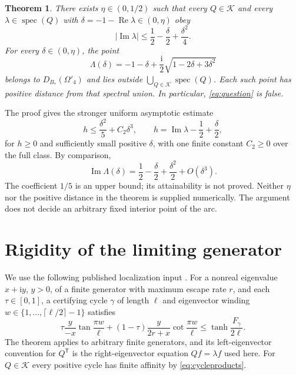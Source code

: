 \documentclass[11pt,a4paper]{article}
\newtheorem{theorem}{Theorem}
\newcommand{\K}{\mathcal K}
\newcommand{\spec}{\operatorname{spec}}
\newcommand{\Rea}{\operatorname{Re}}
\newcommand{\Ima}{\operatorname{Im}}
\newcommand{\ii}{\mathrm i}
\newcommand{\Bstar}{B_*}
\newcommand{\trans}{^{\mathsf T}}
\begin{document}
\begin{theorem}\label{thm:missing}
There exists $\eta\in(0,1/2)$ such that every $Q\in\K$ and every
$\lambda\in\spec(Q)$ with $\delta=-1-\Rea\lambda\in(0,\eta)$ obey
\begin{equation}\label{eq:mainbound}
 |\Ima\lambda|\leq\frac12-\frac\delta2+\frac{\delta^2}{4}.
\end{equation}
For every $\delta\in(0,\eta)$, the point
\begin{equation}\label{eq:compressed}
 \Lambda(\delta)=-1-\delta+
       \frac{\ii}{2}\sqrt{1-2\delta+3\delta^2}
\end{equation}
belongs to $D_{\Bstar}(\Omega'_4)$ and lies outside
$\bigcup_{Q\in\K}\spec(Q)$. Each such point has positive distance
from that spectral union. In particular, \eqref{eq:question} is false.
\end{theorem}

The proof gives the stronger uniform asymptotic estimate
\begin{equation}\label{eq:strongbound}
 h\leq\frac{\delta^2}{5}+C_2\delta^3,
 \qquad h=\Ima\lambda-\frac12+\frac\delta2,
\end{equation}
for $h\geq0$ and sufficiently small positive $\delta$, with one finite
constant $C_2\geq0$ over the full class. By comparison,
\begin{equation}\label{eq:arcexpansion}
 \Ima\Lambda(\delta)=\frac12-\frac\delta2+
                  \frac{\delta^2}{2}+O(\delta^3).
\end{equation}
The coefficient $1/5$ is an upper bound; its attainability is not proved.
Neither $\eta$ nor the positive distance in the theorem is supplied
numerically. The argument does not decide an arbitrary fixed interior
point of the arc.

\section{Rigidity of the limiting generator}\label{sec:rigidity}

We use the following published localization input
\cite[Theorem~3]{Kolchinsky2026}. For a nonreal eigenvalue $x+\ii y$,
$y>0$, of a finite generator with maximum escape rate $r$, and each
$\tau\in[0,1]$, a certifying cycle $\gamma$ of length $\ell$ and
eigenvector winding $w\in\{1,\ldots,\lceil\ell/2\rceil-1\}$ satisfies
\begin{equation}\label{eq:sourcebound}
 \tau\frac{y}{-x}\tan\frac{\pi w}{\ell}
 +(1-\tau)\frac{y}{2r+x}\cot\frac{\pi w}{\ell}
 \leq\tanh\frac{F_\gamma}{2\ell}.
\end{equation}
The theorem applies to arbitrary finite generators, and its
left-eigenvector convention for $Q\trans$ is the right-eigenvector
equation $Qf=\lambda f$ used here. For $Q\in\K$ every positive cycle
has finite affinity by \eqref{eq:cycleproducts}.
\end{document}
